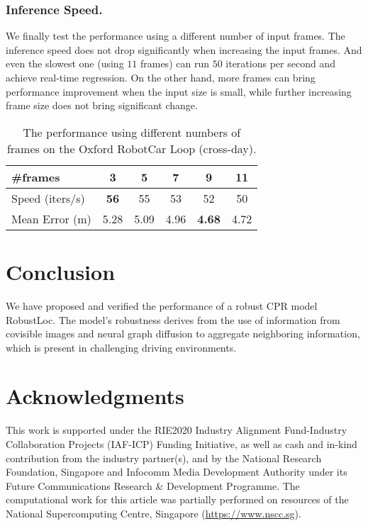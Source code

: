 \documentclass[letterpaper]{article} \usepackage{aaai23}  \usepackage{times}  \usepackage{helvet}  \usepackage{courier}  \usepackage[hyphens]{url}  \usepackage{graphicx} \urlstyle{rm} \def\UrlFont{\rm}  \usepackage{natbib}  \usepackage{caption} \frenchspacing  \setlength{\pdfpagewidth}{8.5in} \setlength{\pdfpageheight}{11in} \usepackage{booktabs}
\theoremstyle{remark}
\theoremstyle{plain}
\begin{document}
\subsubsection{Inference Speed.}
We finally test the performance using a different number of input frames. The inference speed does not drop significantly when increasing the input frames. And even the slowest one (using $11$ frames) can run $50$ iterations per second and achieve real-time regression.  On the other hand, more frames can bring performance improvement when the input size is small, while further increasing frame size does not bring significant change.

\begin{table}[!htp]\footnotesize
\centering
\begin{tabular}{l  c   c   c c c} 
\toprule
\multirow{1}{*}{\#frames} & \multicolumn{1}{c}{3} & \multicolumn{1}{c}{5} & \multicolumn{1}{c}{7} & \multicolumn{1}{c}{9} & \multicolumn{1}{c}{11} \\
\midrule
Speed (iters/s)  & \textbf{56}  & 55  & 53  &  52  &  50\\
Mean Error (m)   &  5.28  &  5.09  &  4.96 & \textbf{4.68}   & 4.72 \\
\bottomrule
\end{tabular}
\caption{The performance using different numbers of frames on the Oxford RobotCar Loop (cross-day).}
\vspace{-0.5cm}
\label{tab:additional insight}
\end{table}






\section{Conclusion}
We have proposed and verified the performance of a robust CPR model RobustLoc. The model's robustness derives from the use of information from covisible images and neural graph diffusion to aggregate neighboring information, which is present in challenging driving environments. 



\section{Acknowledgments}
This work is supported under the RIE2020 Industry Alignment Fund-Industry Collaboration Projects (IAF-ICP) Funding Initiative, as well as cash and in-kind contribution from the industry partner(s), and by the National Research Foundation, Singapore and Infocomm Media Development Authority under its Future Communications Research \& Development Programme. The computational work for this article was partially performed on resources of the National Supercomputing Centre, Singapore (\url{https://www.nscc.sg}).
\end{document}
